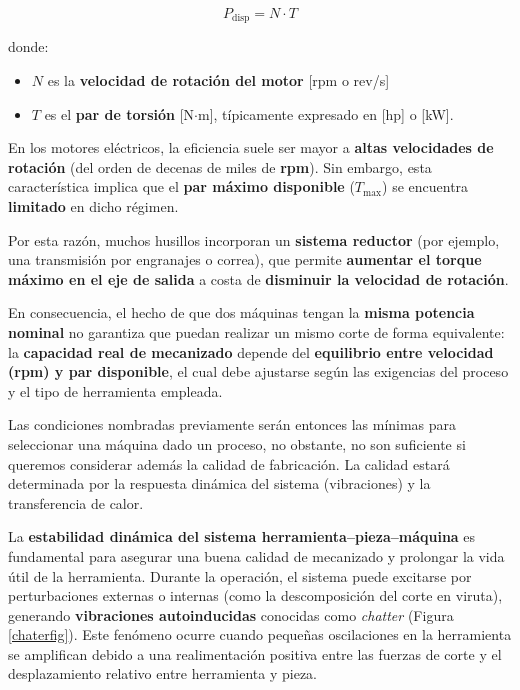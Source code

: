 \begin{equation}
	P_{\text{disp}} = N \cdot T
\end{equation}

donde:

\begin{itemize}
	\item $N$ es la \textbf{velocidad de rotación del motor} [rpm o rev/s]
	\item $T$ es el \textbf{par de torsión} [N$\cdot$m], típicamente expresado en [hp] o [kW].
\end{itemize}

En los motores eléctricos, la eficiencia suele ser mayor a \textbf{altas velocidades de rotación} (del orden de decenas de miles de \textbf{rpm}). Sin embargo, esta característica implica que el \textbf{par máximo disponible} ($T_{\text{max}}$) se encuentra \textbf{limitado} en dicho régimen.

Por esta razón, muchos husillos incorporan un \textbf{sistema reductor} (por ejemplo, una transmisión por engranajes o correa), que permite \textbf{aumentar el torque máximo en el eje de salida} a costa de \textbf{disminuir la velocidad de rotación}. 

En consecuencia, el hecho de que dos máquinas tengan la \textbf{misma potencia nominal} no garantiza que puedan realizar un mismo corte de forma equivalente: la \textbf{capacidad real de mecanizado} depende del \textbf{equilibrio entre velocidad (rpm) y par disponible}, el cual debe ajustarse según las exigencias del proceso y el tipo de herramienta empleada.


Las condiciones nombradas previamente serán entonces las mínimas para seleccionar una máquina dado un proceso, no obstante, no son suficiente si queremos considerar además la calidad de fabricación. La calidad estará determinada por la respuesta dinámica del sistema (vibraciones) y la transferencia de calor.

La \textbf{estabilidad dinámica del sistema herramienta–pieza–máquina} es fundamental para asegurar una buena calidad de mecanizado y prolongar la vida útil de la herramienta. Durante la operación, el sistema puede excitarse por perturbaciones externas o internas (como la descomposición del corte en viruta), generando \textbf{vibraciones autoinducidas} conocidas como \textit{chatter} (Figura \ref{chaterfig}). Este fenómeno ocurre cuando pequeñas oscilaciones en la herramienta se amplifican debido a una realimentación positiva entre las fuerzas de corte y el desplazamiento relativo entre herramienta y pieza.

